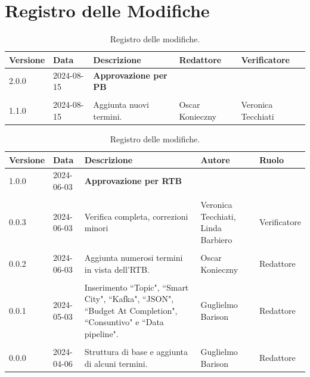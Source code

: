 \documentclass[8pt]{article}
\begin{document}
	\section*{Registro delle Modifiche}
	\begin{table}[ht!]	
		\centering
		\begin{tabular}{p{1.2cm} p{2cm} p{5cm} p{3cm} p{3cm}}
			\toprule
			\textbf{Versione}& \textbf{Data} & \textbf{Descrizione} & \textbf{Redattore} & \textbf{Verificatore} \\
			\midrule
				2.0.0 & 2024-08-15 & \textbf{Approvazione per PB} & & \\\\
				1.1.0 & 2024-08-15 & Aggiunta nuovi termini. & Oscar Konieczny & Veronica Tecchiati \\
			\bottomrule
		\end{tabular}
		\caption{Registro delle modifiche.}
		\label{table:Registro delle modifiche}
	\end{table}
	\clearpage
	\begin{table}[ht!]	
		\centering
		\begin{tabular}{p{1.2cm} p{2cm} p{6cm} p{3cm} p{2cm}}
			\toprule
			\textbf{Versione}& \textbf{Data} & \textbf{Descrizione} & \textbf{Autore} & \textbf{Ruolo} \\
			\midrule
        		1.0.0 & 2024-06-03 & \textbf{Approvazione per RTB} & & \\\\
      			0.0.3 & 2024-06-03 & Verifica completa, correzioni minori & Veronica Tecchiati, Linda Barbiero & Verificatore \\\\
				0.0.2 & 2024-06-03 & Aggiunta numerosi termini in vista dell'RTB. & Oscar Konieczny & Redattore \\\\
				0.0.1 & 2024-05-03 & Inserimento ``Topic", ``Smart City", ``Kafka", ``JSON", ``Budget At Completion", ``Consuntivo" e ``Data pipeline".  & Guglielmo Barison & Redattore \\\\%
    			0.0.0 & 2024-04-06 & Struttura di base e aggiunta di alcuni termini.  & Guglielmo Barison & Redattore \\%
			\bottomrule
		\end{tabular}
		\caption{Registro delle modifiche.}
		\label{table:Registro delle modifiche}
	\end{table}
	\newpage
	\tableofcontents
	\clearpage
	\newpage
	\justifying
\end{document}
